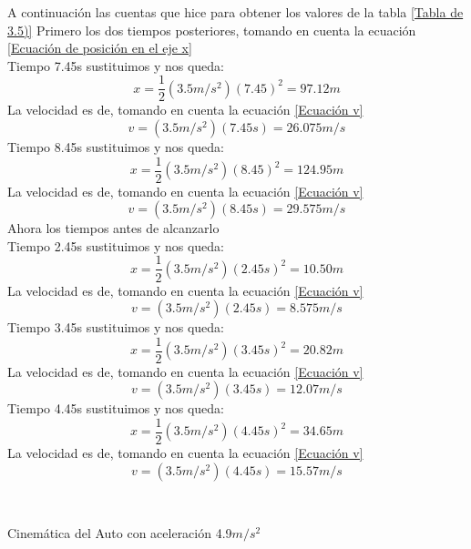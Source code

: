 \documentclass[letterpaper, 12pt]{article}
\begin{document}
\begin{enumerate}
\begin{enumerate}
\vspace{2cm} 
A continuación las cuentas que hice para obtener los valores de la tabla \ref{Tabla de 3.5)}
Primero los dos tiempos posteriores, tomando en cuenta la ecuación \ref{Ecuación de posición en el eje x}\\
Tiempo 7.45s sustituimos y nos queda:
    \begin{equation}
    x= \frac{1}{2} (3.5m/s^2)(7.45)^2 = 97.12m
    \end{equation} 
La velocidad es de, tomando en cuenta la ecuación \ref{Ecuación v}
\begin{equation}
    v = (3.5m/s^2)(7.45s) = 26.075m/s
\end{equation}
Tiempo 8.45s sustituimos y nos queda:
    \begin{equation}
    x= \frac{1}{2} (3.5m/s^2)(8.45)^2 = 124.95m
    \end{equation} 
La velocidad es de, tomando en cuenta la ecuación \ref{Ecuación v}
\begin{equation}
    v = (3.5m/s^2)(8.45s) = 29.575m/s
\end{equation}
Ahora los tiempos antes de alcanzarlo \\
Tiempo 2.45s sustituimos y nos queda:
    \begin{equation}
    x= \frac{1}{2} (3.5m/s^2)(2.45s)^2 = 10.50m
    \end{equation} 
La velocidad es de, tomando en cuenta la ecuación \ref{Ecuación v}
\begin{equation}
    v = (3.5m/s^2)(2.45s) = 8.575m/s
    \end{equation}
Tiempo 3.45s sustituimos y nos queda:
    \begin{equation}
    x= \frac{1}{2} (3.5m/s^2)(3.45s)^2 = 20.82m
    \end{equation} 
La velocidad es de, tomando en cuenta la ecuación \ref{Ecuación v}
\begin{equation}
    v = (3.5m/s^2)(3.45s) = 12.07m/s
    \end{equation}
Tiempo 4.45s sustituimos y nos queda:
    \begin{equation}
    x= \frac{1}{2} (3.5m/s^2)(4.45s)^2 = 34.65m
    \end{equation} 
La velocidad es de, tomando en cuenta la ecuación \ref{Ecuación v}
\begin{equation}
    v = (3.5m/s^2)(4.45s) = 15.57m/s
    \end{equation}
\end{enumerate}
\\
\vspace{1cm}
 \begin{table}[h]
\label{Tabla de auto 4.9}
    \centering
\caption{{Cinemática del Auto con aceleración 4.9$m/s^2$}}


\end{table}
\end{enumerate}
\end{document}
